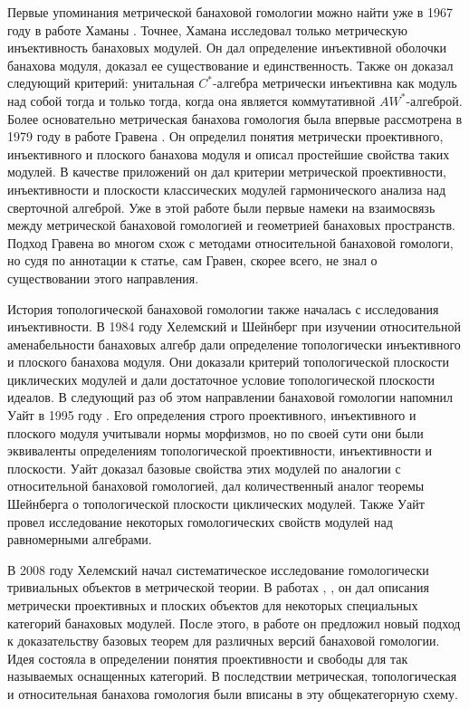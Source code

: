 Первые упоминания метрической банаховой гомологии можно найти уже в 1967 году в работе Хаманы \cite{HamInjEnvBanMod}. Точнее, Хамана исследовал только метрическую инъективность банаховых модулей. Он дал определение инъективной оболочки банахова модуля, доказал ее существование и единственность. Также он доказал следующий критерий: унитальная $C^*$-алгебра метрически инъективна как модуль над собой тогда и только тогда, когда она является коммутативной $AW^*$-алгеброй. Более основательно метрическая банахова гомология была впервые рассмотрена в 1979 году в работе Гравена \cite{GravInjProjBanMod}. Он определил понятия метрически проективного, инъективного и плоского банахова модуля и описал простейшие свойства таких модулей. В качестве приложений он дал критерии метрической проективности, инъективности и плоскости классических модулей гармонического анализа над сверточной алгеброй. Уже в этой работе были первые намеки на взаимосвязь между метрической банаховой гомологией и геометрией банаховых пространств. Подход Гравена во многом схож с методами относительной банаховой гомологи, но судя по аннотации к статье, сам Гравен, скорее всего, не знал о существовании этого направления.

История топологической банаховой гомологии также началась с исследования инъективности. В 1984 году Хелемский и Шейнберг \cite{HelemSheinbergFlatBanModAndAmenBanAlg} при изучении относительной аменабельности банаховых алгебр дали определение топологически инъективного и плоского банахова модуля. Они доказали критерий топологической плоскости циклических модулей и дали достаточное условие топологической плоскости идеалов. В следующий раз об этом направлении банаховой гомологии напомнил Уайт в 1995 году \cite{WhiteInjmoduAlg}. Его определения строго проективного, инъективного и плоского модуля учитывали нормы морфизмов, но по своей сути они были эквиваленты определениям топологической проективности, инъективности и плоскости. Уайт доказал базовые свойства этих модулей по аналогии с относительной банаховой гомологией, дал количественный аналог теоремы Шейнберга о топологической плоскости циклических модулей. Также Уайт провел исследование некоторых гомологических свойств модулей над равномерными алгебрами. 

В 2008 году Хелемский начал систематическое исследование гомологически тривиальных объектов в метрической теории. В работах \cite{HelemNonMatrVersnExtPrincplByArvsnWttstck}, \cite{HelMetrFlatNorMod}, \cite{HelemExtrmVersnProjNorModOverSeqAlgs} он дал описания метрически проективных и плоских объектов для некоторых специальных категорий банаховых модулей. После этого, в работе \cite{HelMetrFrQMod} он предложил новый подход к доказательству базовых теорем для различных версий банаховой гомологии. Идея состояла в определении понятия проективности и свободы для так называемых оснащенных категорий. В последствии метрическая, топологическая и относительная банахова гомология были вписаны в эту общекатегорную схему. 

